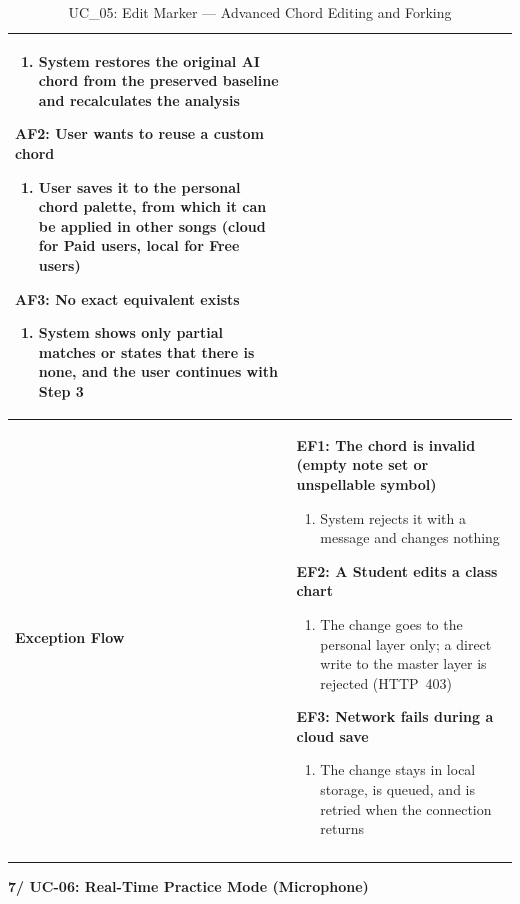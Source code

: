 \documentclass[a4paper]{article}
\newlength{\ucLeft}
\begin{document}
\begin{longtable}{|>{\bfseries}p{\ucLeft}|p{\dimexpr\linewidth-\ucLeft-2\tabcolsep-2\arrayrulewidth}|}
\begin{enumerate}[leftmargin=1.5em, nosep, topsep=2pt, partopsep=0pt, parsep=0pt, after=\strut]
    \item System restores the original AI chord from the preserved baseline and recalculates the analysis
\end{enumerate}
\textbf{AF2: User wants to reuse a custom chord}
\begin{enumerate}[leftmargin=1.5em, nosep, topsep=2pt, partopsep=0pt, parsep=0pt, after=\strut]
    \item User saves it to the personal chord palette, from which it can be applied in other songs (cloud for Paid users, local for Free users)
\end{enumerate}
\textbf{AF3: No exact equivalent exists}
\begin{enumerate}[leftmargin=1.5em, nosep, topsep=2pt, partopsep=0pt, parsep=0pt, after=\strut]
    \item System shows only partial matches or states that there is none, and the user continues with Step 3
\end{enumerate}
\\ \hline
Exception Flow &
\textbf{EF1: The chord is invalid (empty note set or unspellable symbol)}
\begin{enumerate}[leftmargin=1.5em, nosep, topsep=2pt, partopsep=0pt, parsep=0pt, after=\strut]
    \item System rejects it with a message and changes nothing
\end{enumerate}
\textbf{EF2: A Student edits a class chart}
\begin{enumerate}[leftmargin=1.5em, nosep, topsep=2pt, partopsep=0pt, parsep=0pt, after=\strut]
    \item The change goes to the personal layer only; a direct write to the master layer is rejected (HTTP~403)
\end{enumerate}
\textbf{EF3: Network fails during a cloud save}
\begin{enumerate}[leftmargin=1.5em, nosep, topsep=2pt, partopsep=0pt, parsep=0pt, after=\strut]
    \item The change stays in local storage, is queued, and is retried when the connection returns
\end{enumerate}
\\ \hline
\caption{UC\_05: Edit Marker --- Advanced Chord Editing and Forking}\label{tab:uc05}
\end{longtable}

\vspace{0.5em}
\noindent\textbf{7/ UC-06: Real-Time Practice Mode (Microphone)}
\end{document}
